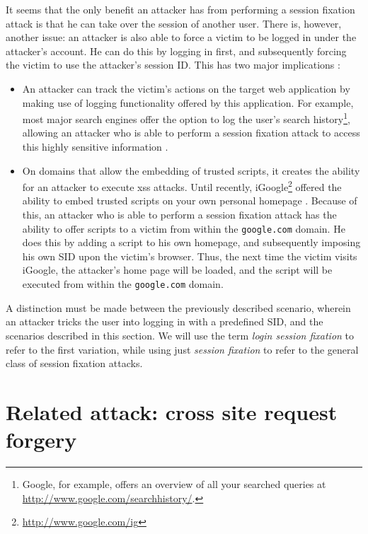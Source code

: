 It seems that the only benefit an attacker has from performing a session fixation attack is that he can take over the session of another user. There is, however, another issue: an attacker is also able to force a victim to be logged in under the attacker's account. He can do this by logging in first, and subsequently forcing the victim to use the attacker's session ID. This has two major implications \cite{Barth2008}:
\begin{itemize}
	\item An attacker can track the victim's actions on the target web application by making use of logging functionality offered by this application. For example, most major search engines offer the option to log the user's search history\footnote{Google, for example, offers an overview of all your searched queries at \url{http://www.google.com/searchhistory/}.}, allowing an attacker who is able to perform a session fixation attack to access this highly sensitive information \cite{Barbaro2006}.
	\item On domains that allow the embedding of trusted scripts, it creates the ability for an attacker to execute \gls{xss} attacks. Until recently, iGoogle\footnote{\url{http://www.google.com/ig}} offered the ability to embed trusted scripts on your own personal homepage \cite{Barth2008}. Because of this, an attacker who is able to perform a session fixation attack has the ability to offer scripts to a victim from within the \texttt{google.com} domain. He does this by adding a script to his own homepage, and subsequently imposing his own SID upon the victim's browser. Thus, the next time the victim visits iGoogle, the attacker's home page will be loaded, and the script will be executed from within the \texttt{google.com} domain.
\end{itemize}
A distinction must be made between the previously described scenario, wherein an attacker tricks the user into logging in with a predefined SID, and the scenarios described in this section. We will use the term \emph{\gls{login session fixation}} to refer to the first variation, while using just \emph{session fixation} to refer to the general class of session fixation attacks.

\section{Related attack: cross site request forgery}\label{csrf}

